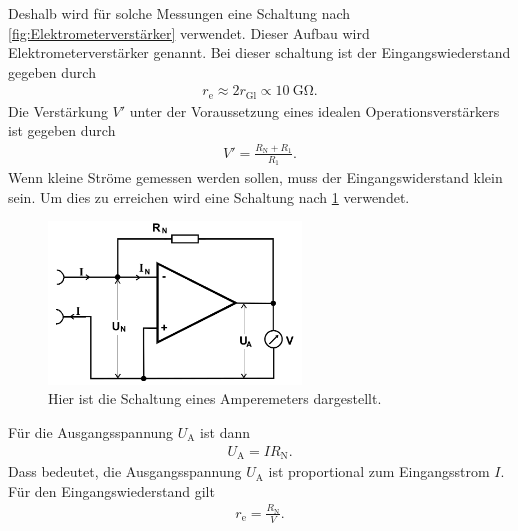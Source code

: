 Deshalb wird für solche Messungen eine Schaltung nach \cref{fig:Elektrometerverstärker} verwendet.
Dieser Aufbau wird Elektrometerverstärker genannt.
Bei dieser schaltung ist der Eingangswiederstand gegeben durch
\begin{align}
	r_\text{e}\approx 2r_\text{Gl}\propto \SI{10}{\giga\ohm}.
\end{align}
Die Verstärkung $V'$ unter der Voraussetzung eines idealen Operationsverstärkers ist gegeben durch
\begin{align}
	V'=\frac{R_\text{N}+R_1}{R_1 }.
\end{align}
\indent
Wenn kleine Ströme gemessen werden sollen, muss der Eingangswiderstand klein sein.
Um dies zu erreichen wird eine Schaltung nach \cref{fig:Amperemeter} verwendet.
\begin{figure}[h!]
	\centering
	\includegraphics[width = 0.6\textwidth]{../Grafiken/Amperemeter.png}
	\caption{Hier ist die Schaltung eines Amperemeters dargestellt. \cite{V51}\label{fig:Amperemeter}}
\end{figure}
\FloatBarrier
Für die Ausgangsspannung $U_\text{A}$ ist dann
\begin{align}
	U_\text{A}=IR_\text{N}.\label{eq:amperemeter_strom}
\end{align}
Dass bedeutet, die Ausgangsspannung $U_\text{A}$ ist proportional zum Eingangsstrom $I$.
Für den Eingangswiederstand gilt\\
\begin{align*}
	r_\text{e}=\frac{R_\text{N}}{V}.
	\label{eq:eingangswiderstand}
\end{align*}
